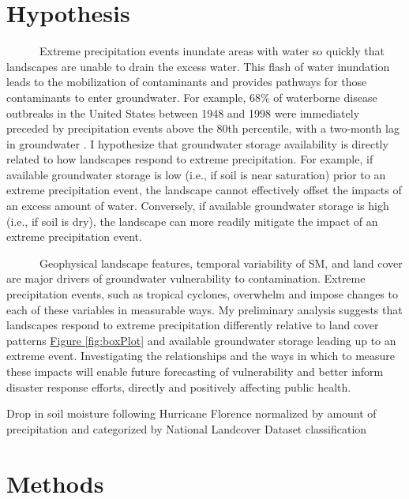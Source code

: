 \documentclass[
]{book}
\begin{document}
\hypertarget{hypothesis}{%
\chapter{Hypothesis}\label{hypothesis}}

~~~~~~Extreme precipitation events inundate areas with water so quickly that landscapes are unable to drain the excess water. This flash of water inundation leads to the mobilization of contaminants and provides pathways for those contaminants to enter groundwater. For example, 68\% of waterborne disease outbreaks in the United States between 1948 and 1998 were immediately preceded by precipitation events above the 80th percentile, with a two-month lag in groundwater \citep{curriero2001}. I hypothesize that groundwater storage availability is directly related to how landscapes respond to extreme precipitation. For example, if available groundwater storage is low (i.e., if soil is near saturation) prior to an extreme precipitation event, the landscape cannot effectively offset the impacts of an excess amount of water. Conversely, if available groundwater storage is high (i.e., if soil is dry), the landscape can more readily mitigate the impact of an extreme precipitation event.

~~~~~~Geophysical landscape features, temporal variability of SM, and land cover are major drivers of groundwater vulnerability to contamination. Extreme precipitation events, such as tropical cyclones, overwhelm and impose changes to each of these variables in measurable ways. My preliminary analysis suggests that landscapes respond to extreme precipitation differently relative to land cover patterns \protect\hyperlink{fig:boxPlot}{Figure \ref{fig:boxPlot}} and available groundwater storage leading up to an extreme event. Investigating the relationships and the ways in which to measure these impacts will enable future forecasting of vulnerability and better inform disaster response efforts, directly and positively affecting public health.

\hypertarget{htmlwidget-06ac727f030a77da3d00}{}

\label{fig:boxPlot}Drop in soil moisture following Hurricane Florence normalized by amount of precipitation and categorized by National Landcover Dataset classification

\hypertarget{methods}{%
\chapter{Methods}\label{methods}}
\end{document}
